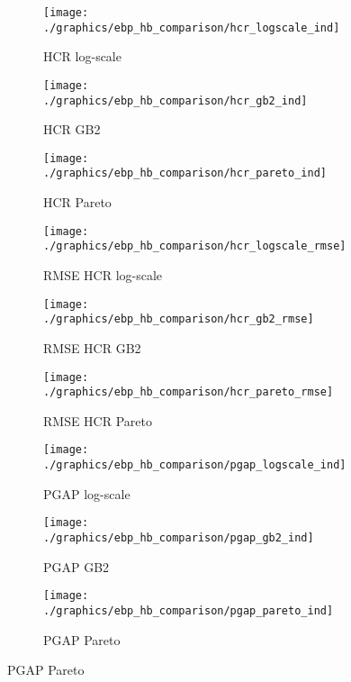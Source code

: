 \begin{figure}
    \begin{subfigure}{0.31\linewidth}
        \centering
        \texttt{[image: ./graphics/ebp\_hb\_comparison/hcr\_logscale\_ind]}
        \caption{HCR log-scale}
    \end{subfigure}
    \begin{subfigure}{0.31\linewidth}
        \centering
        \texttt{[image: ./graphics/ebp\_hb\_comparison/hcr\_gb2\_ind]}
        \caption{HCR GB2}
    \end{subfigure}
    \begin{subfigure}{0.31\linewidth}
        \centering
        \texttt{[image: ./graphics/ebp\_hb\_comparison/hcr\_pareto\_ind]}
        \caption{HCR Pareto}
    \end{subfigure}

    \begin{subfigure}{0.31\linewidth}
        \centering
        \texttt{[image: ./graphics/ebp\_hb\_comparison/hcr\_logscale\_rmse]}
        \caption{RMSE HCR log-scale}
    \end{subfigure}
    \begin{subfigure}{0.31\linewidth}
        \centering
        \texttt{[image: ./graphics/ebp\_hb\_comparison/hcr\_gb2\_rmse]}
        \caption{RMSE HCR GB2}
    \end{subfigure}
    \begin{subfigure}{0.31\linewidth}
        \centering
        \texttt{[image: ./graphics/ebp\_hb\_comparison/hcr\_pareto\_rmse]}
        \caption{RMSE HCR Pareto}
    \end{subfigure}

    \begin{subfigure}{0.31\linewidth}
        \centering
        \texttt{[image: ./graphics/ebp\_hb\_comparison/pgap\_logscale\_ind]}
        \caption{PGAP log-scale}
    \end{subfigure}
    \begin{subfigure}{0.31\linewidth}
        \centering
        \texttt{[image: ./graphics/ebp\_hb\_comparison/pgap\_gb2\_ind]}
        \caption{PGAP GB2}
    \end{subfigure}
    \begin{subfigure}{0.31\linewidth}
        \centering
        \texttt{[image: ./graphics/ebp\_hb\_comparison/pgap\_pareto\_ind]}
        \caption{PGAP Pareto}
    \end{subfigure}


\end{figure}
